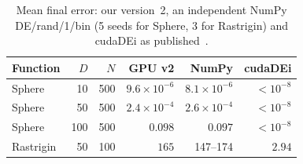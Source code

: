 \documentclass[conference]{IEEEtran}
\begin{document}
\begin{table}[!t]
\centering
\caption{Mean final error: our version~2, an independent NumPy DE/rand/1/bin (5 seeds for
Sphere, 3 for Rastrigin) and cudaDEi as published~\cite{qin2012}.}
\label{tab:qin}
\footnotesize\setlength{\tabcolsep}{4pt}
\begin{tabular}{lrrrrr}
\toprule
Function & $D$ & $N$ & GPU v2 & NumPy & cudaDEi\\
\midrule
Sphere    & 10  & 500 & $9.6{\times}10^{-6}$ & $8.1{\times}10^{-6}$ & $<10^{-8}$\\
Sphere    & 50  & 500 & $2.4{\times}10^{-4}$ & $2.6{\times}10^{-4}$ & $<10^{-8}$\\
Sphere    & 100 & 500 & $0.098$              & $0.097$              & $<10^{-8}$\\
Rastrigin & 50  & 100 & $165$                & 147--174             & $2.94$\\
\bottomrule
\end{tabular}
\end{table}
\end{document}
